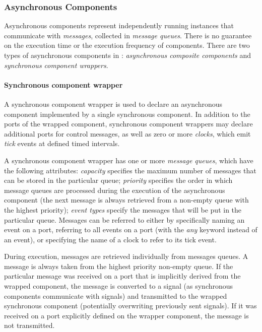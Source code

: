 
\subsubsection{Asynchronous Components}
Asynchronous components represent independently running instances that communicate with \emph{messages}, collected in \emph{message queues}. There is no guarantee on the execution time or the execution frequency of components. 
There are two types of asynchronous components in \gamma: \emph{asynchronous composite components} and \emph{synchronous component wrappers}.

\paragraph{Synchronous component wrapper} A synchronous component wrapper is used to declare an asynchronous component implemented by a single synchronous component. In addition to the ports of the wrapped component, synchronous component wrappers may declare additional ports for control messages, as well as zero or more \emph{clocks}, which emit \emph{tick} events at defined timed intervals.

A synchronous component wrapper has one or more
\emph{message queues}, which have the following attributes: \emph{capacity} specifies the maximum number of messages that can be stored in the particular	queue; \emph{priority} specifies the order in which message queues are processed during 	the execution of the asynchronous component (the next message is always retrieved from a non-empty queue with the highest priority); \emph{event types} specify the messages that will be put in the particular queue. Messages can be referred to either by specifically naming an event on a port, referring to all events on a port (with the \emph{any} keyword instead of an event), or specifying the name of a clock to refer to its tick event.

During execution, messages are retrieved individually from messages queues. A message
is always taken from the highest priority non-empty queue. If the particular message was
received on a port that is implicitly derived from the wrapped component, the message is
converted to a signal (as synchronous components communicate with signals) and transmitted
to the wrapped synchronous component (potentially overwriting previously sent signals). If
it was received on a port explicitly defined on the wrapper component, the message is not transmitted.

